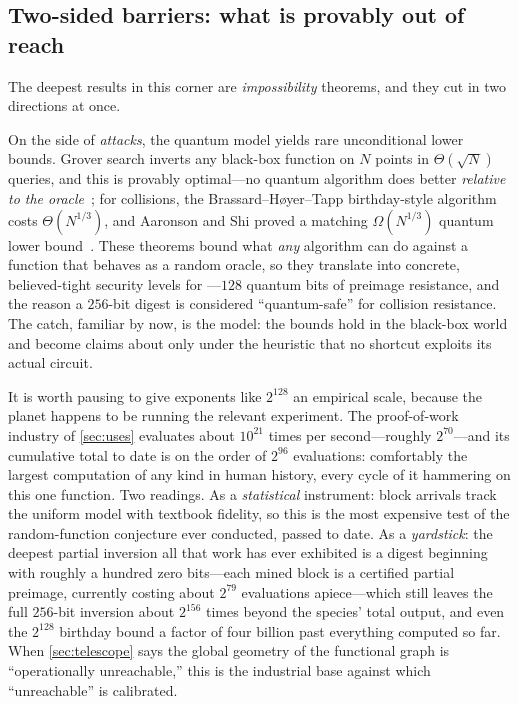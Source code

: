 \subsection{Two-sided barriers: what is provably out of reach}
\label{sec:barriers}

The deepest results in this corner are \emph{impossibility} theorems,
and they cut in two directions at once.

On the side of \emph{attacks}, the quantum model yields rare
unconditional lower bounds. Grover search inverts any black-box function
on $N$ points in $\Theta(\sqrt{N})$ queries, and this is provably
optimal---no quantum algorithm does better \emph{relative to the
oracle}~\citep{BBBV1997}; for collisions, the Brassard--H{\o}yer--Tapp
birthday-style algorithm costs $\Theta(N^{1/3})$, and Aaronson and Shi
proved a matching $\Omega(N^{1/3})$ quantum lower
bound~\citep{AaronsonShi2004}. These theorems bound what \emph{any}
algorithm can do against a function that behaves as a random oracle, so
they translate into concrete, believed-tight security levels for
\SHA{}---$128$ quantum bits of preimage resistance, and the reason a
$256$-bit digest is considered ``quantum-safe'' for collision resistance.
The catch, familiar by now, is the model: the bounds hold in the
black-box world and become claims about \SHA{} only under the heuristic
that no shortcut exploits its actual circuit.

It is worth pausing to give exponents like $2^{128}$ an empirical
scale, because the planet happens to be running the relevant
experiment. The proof-of-work industry of \cref{sec:uses} evaluates
\SHA{} about $10^{21}$ times per second---roughly $2^{70}$---and its
cumulative total to date is on the order of $2^{96}$ evaluations:
comfortably the largest computation of any kind in human history,
every cycle of it hammering on this one function. Two readings. As a
\emph{statistical} instrument: block arrivals track the uniform model
with textbook fidelity, so this is the most expensive test of the
random-function conjecture ever conducted, passed to date. As a
\emph{yardstick}: the deepest partial inversion all that work has ever
exhibited is a digest beginning with roughly a hundred zero
bits---each mined block is a certified partial preimage, currently
costing about $2^{79}$ evaluations apiece---which still leaves the full
$256$-bit inversion about $2^{156}$ times beyond the species' total
output, and even the $2^{128}$ birthday bound a factor of four billion
past everything computed so far. When \cref{sec:telescope} says the
global geometry of the functional graph is ``operationally
unreachable,'' this is the industrial base against which
``unreachable'' is calibrated.

